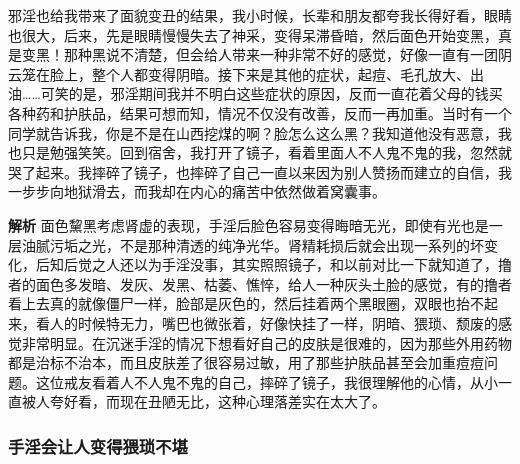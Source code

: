 \begin{case}
    邪淫也给我带来了面貌变丑的结果，我小时候，长辈和朋友都夸我长得好看，眼睛也很大，后来，先是眼睛慢慢失去了神采，变得呆滞昏暗，然后面色开始变黑，真是变黑！那种黑说不清楚，但会给人带来一种非常不好的感觉，好像一直有一团阴云笼在脸上，整个人都变得阴暗。接下来是其他的症状，起痘、毛孔放大、出油……可笑的是，邪淫期间我并不明白这些症状的原因，反而一直花着父母的钱买各种药和护肤品，结果可想而知，情况不仅没有改善，反而一再加重。当时有一个同学就告诉我，你是不是在山西挖煤的啊？脸怎么这么黑？我知道他没有恶意，我也只是勉强笑笑。回到宿舍，我打开了镜子，看着里面人不人鬼不鬼的我，忽然就哭了起来。我摔碎了镜子，也摔碎了自己一直以来因为别人赞扬而建立的自信，我一步步向地狱滑去，而我却在内心的痛苦中依然做着窝囊事。

    \textbf{解析} 面色黧黑考虑肾虚的表现，手淫后脸色容易变得晦暗无光，即使有光也是一层油腻污垢之光，不是那种清透的纯净光华。肾精耗损后就会出现一系列的坏变化，后知后觉之人还以为手淫没事，其实照照镜子，和以前对比一下就知道了，撸者的面色多发暗、发灰、发黑、枯萎、憔悴，给人一种灰头土脸的感觉，有的撸者看上去真的就像僵尸一样，脸部是灰色的，然后挂着两个黑眼圈，双眼也抬不起来，看人的时候特无力，嘴巴也微张着，好像快挂了一样，阴暗、猥琐、颓废的感觉非常明显。在沉迷手淫的情况下想看好自己的皮肤是很难的，因为那些外用药物都是治标不治本，而且皮肤差了很容易过敏，用了那些护肤品甚至会加重痘痘问题。这位戒友看着人不人鬼不鬼的自己，摔碎了镜子，我很理解他的心情，从小一直被人夸好看，而现在丑陋无比，这种心理落差实在太大了。
\end{case}

\subsubsection{手淫会让人变得猥琐不堪}

